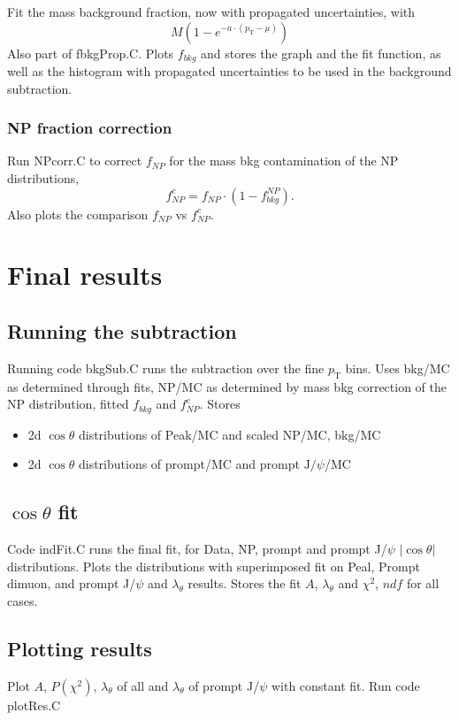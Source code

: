 \documentclass{article}
\newcommand{\pt}{p_\text{T}}
\newcommand{\cost}{\cos\theta}
\newcommand{\jpsi}{\text{J}/\psi}
\begin{document}
Fit the mass background fraction, now with propagated uncertainties, with 
\begin{equation}
M\left(1-e^{-a\cdot(\pt-\mu)}\right)
\end{equation}
Also part of fbkgProp.C. Plots $f_{bkg}$ and stores the graph and the fit function, as well as the histogram with propagated uncertainties to be used in the background subtraction.

\subsubsection{NP fraction correction}

Run NPcorr.C to correct $f_{NP}$ for the mass bkg contamination of the NP distributions,
\begin{equation}
f_{NP}^c = f_{NP}\cdot\left(1-f_{bkg}^{NP}\right).
\end{equation}
Also plots the comparison $f_{NP}$ vs $f_{NP}^c$.

\pagebreak

\section{Final results}

\subsection{Running the subtraction}

Running code bkgSub.C runs the subtraction over the fine $\pt$ bins. Uses bkg/MC as determined through fits, NP/MC as determined by mass bkg correction of the NP distribution, fitted $f_{bkg}$ and $f_{NP}^c$. Stores
\begin{itemize}
\item 2d $\cost$ distributions of Peak/MC and scaled NP/MC, bkg/MC
\item 2d $\cost$ distributions of prompt/MC and prompt $\jpsi$/MC
\end{itemize}

\subsection{$\cost$ fit}

Code indFit.C runs the final fit, for  Data, NP, prompt and prompt J/$\psi$ $|\cost|$ distributions. Plots the distributions with superimposed fit on Peal, Prompt dimuon, and prompt J/$\psi$ and $\lambda_\theta$ results. Stores the fit $A$, $\lambda_\theta$ and $\chi^2$, $ndf$ for all cases. 

\subsection{Plotting results}

Plot $A$, $P(\chi^2)$, $\lambda_\theta$ of all and $\lambda_\theta$ of prompt J/$\psi$ with constant fit. Run code plotRes.C
\end{document}
